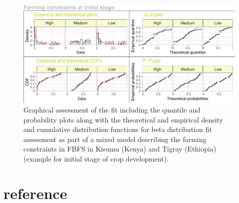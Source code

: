 \documentclass[12pt,oneside]{article}
\begin{document}
\begin{figure}[!htbp]

{\centering \includegraphics{Modelling_FBFS_Supplement_files/figure-latex/fig8-1} 

}

\caption{Graphical assessment of the fit including the quantile and probability plots along with the theoretical and empirical density and cumulative distribution functions for beta distribution fit assessment as part of a mixed model describing the farming constraints in FBFS in Kisumu (Kenya) and Tigray (Ethiopia) (example for initial stage of crop development).}\label{fig:fig8}
\end{figure}

\hypertarget{III}{%
\section{reference}\label{III}}
\end{document}
